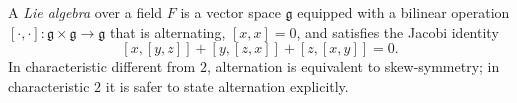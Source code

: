 
A \emph{Lie algebra} over a field $F$ is a vector space $\mathfrak g$ equipped with a bilinear operation $[\cdot,\cdot]:\mathfrak g\times\mathfrak g\to\mathfrak g$ that is alternating, $[x,x]=0$, and satisfies the Jacobi identity
\[
[x,[y,z]]+[y,[z,x]]+[z,[x,y]]=0.
\]
In characteristic different from $2$, alternation is equivalent to skew-symmetry; in characteristic $2$ it is safer to state alternation explicitly.
